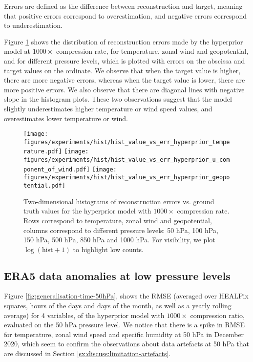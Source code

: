 \documentclass[11pt, a4paper, logo, copyright, numbering]{googledeepmind}
\begin{document}
Errors are defined as the difference between reconstruction and target, meaning that positive errors correspond to overestimation, and negative errors correspond to underestimation.

Figure \ref{fig:hist2d-err-value} shows the distribution of reconstruction errors made by the hyperprior model at $1000\times$ compression rate, for temperature, zonal wind and geopotential, and for different pressure levels, which is plotted with errors on the abscissa and target values on the ordinate. We observe that when the target value is higher, there are more negative errors, whereas when the target value is lower, there are more positive errors. We also observe that there are diagonal lines with negative slope in the histogram plots. These two observations suggest that the model slightly underestimates higher temperature or wind speed values, and overestimates lower temperature or wind.

\begin{figure}
    \centering
    \texttt{[image: figures/experiments/hist/hist\_value\_vs\_err\_hyperprior\_temperature.pdf]}
    \texttt{[image: figures/experiments/hist/hist\_value\_vs\_err\_hyperprior\_u\_component\_of\_wind.pdf]}
    \texttt{[image: figures/experiments/hist/hist\_value\_vs\_err\_hyperprior\_geopotential.pdf]}
    \hfill
    \caption{Two-dimensional histograms of reconstruction errors vs. ground truth values for the hyperprior model with $1000\times$ compression rate. Rows correspond to temperature, zonal wind and geopotential, columns correspond to different pressure levels: 50 hPa, 100 hPa, 150 hPa, 500 hPa, 850 hPa and 1000 hPa. For visibility, we plot $\log(\text{hist}+1)$ to highlight low counts.}
    \label{fig:hist2d-err-value}
\end{figure}

\subsection{ERA5 data anomalies at low pressure levels}
\label{sx:appendix:artefacts}

Figure \ref{fig:generalisation-time-50hPa}, shows the RMSE (averaged over HEALPix squares, hours of the days and days of the month, as well as a yearly rolling average) for 4 variables, of the hyperprior model with $1000\times$ compression ratio, evaluated on the 50 hPa pressure level. We notice that there is a spike in RMSE for temperature, zonal wind speed and specific humidity at 50 hPa in December 2020, which seem to confirm the observations about data artefacts at 50 hPa that are discussed in Section \ref{sx:discuss:limitation-artefacts}.
\end{document}
